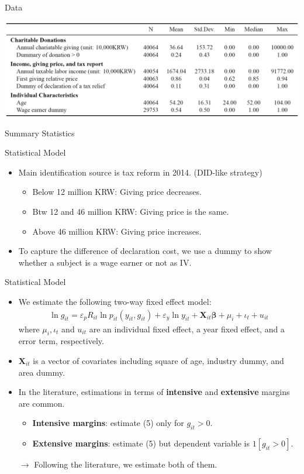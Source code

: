 \documentclass[dvipdfmx,10pt]{beamer}
\begin{document}
\begin{frame}{Data}
	\begin{table}
		\centering
		\includegraphics[width=0.9\linewidth]{Tab_Stat}
		\caption{Summary Statistics}
		\label{tab:1}
	\end{table}
\end{frame}

\begin{frame}{Statistical Model}
\begin{itemize}
	\item Main identification source is tax reform in 2014. (DID-like strategy)
	\begin{itemize}
		\item Below 12 million KRW: Giving price decreases.
		\item Btw 12 and 46 million KRW: Giving price is the same.
		\item Above 46 million KRW: Giving price increases.
	\end{itemize}
	\item To capture the difference of declaration cost, we use a dummy to show whether a subject is a wage earner or not as IV.
\end{itemize}
\end{frame}

\begin{frame}{Statistical Model}
	\begin{itemize}
		\item We estimate the following two-way fixed effect model:
		\begin{align}
			\ln g_{it} = \varepsilon_pR_{it} \ln p_{it}(y_{it}, g_{it}) + \varepsilon_y \ln y_{it} + \bm{X}_{it}\bm{\beta} + \mu_i + \iota_t + u_{it}\tag{5}
		\end{align}
	where $\mu_i, \iota_t$ and $ u_{it}$ are an individual fixed effect, a year fixed effect, and a error term, respectively. 
	\item $\bm{X}_{it}$ is a vector of covariates including square of age, industry dummy, and area dummy.
	\item In the literature, estimations in terms of \textbf{intensive} and \textbf{extensive} margins are common.
	\begin{itemize}
		\item \textbf{Intensive margins}: estimate (5) only for $g_{it}>0$.
		\item \textbf{Extensive margins}: estimate (5) but dependent variable is $1[g_{it}>0]$.
	\end{itemize}
	$\to$ Following the literature, we estimate both of them.
	\end{itemize}
\end{frame}
\end{document}
